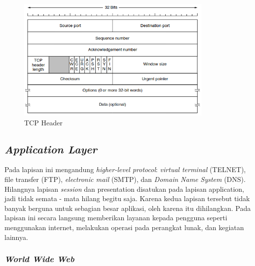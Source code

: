 \begin{figure}[H]
  \centering{}
	\includegraphics[width=0.85\textwidth]{gambar/the_TCP_header}
  \caption{TCP Header}
\end{figure}


\subsection{\emph{Application Layer}}

Pada lapisan ini mengandung \emph{higher-level protocol}: \emph{virtual terminal} (TELNET), file transfer (FTP), \emph{electronic mail} (SMTP), dan \emph{Domain Name System} (DNS). Hilangnya lapisan \emph{session} dan presentation disatukan pada lapisan application, jadi tidak semata - mata hilang begitu saja. Karena kedua lapisan tersebut tidak banyak berguna untuk sebagian besar aplikasi, oleh karena itu dihilangkan. Pada lapisan ini secara langsung memberikan layanan kepada pengguna seperti menggunakan internet, melakukan operasi pada perangkat lunak, dan kegiatan lainnya.

\subsubsection{\emph{World Wide Web}}


